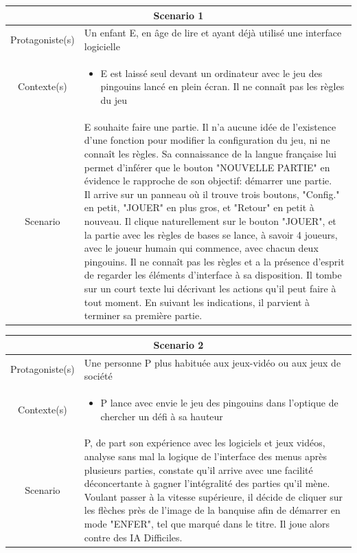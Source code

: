 \documentclass{report}
\begin{document}
\begin{tabular}{|c|l|}
 \hline
 \multicolumn{2}{|c|}{Scenario 1}\\
 \hline
 Protagoniste(s) & Un enfant E, en âge de lire et ayant déjà utilisé une interface logicielle \\
 \hline
 Contexte(s) & \parbox{13cm} {\begin{itemize}
 	\item E est laissé seul devant un ordinateur avec le jeu des pingouins lancé en plein écran. Il ne connaît pas les règles du jeu
\end{itemize} }\\
 \hline
 Scenario & \parbox{13cm}{ E souhaite faire une partie. Il n'a aucune idée de l'existence d'une fonction pour modifier la configuration du jeu, ni ne connaît les règles. Sa connaissance de la langue française lui permet d'inférer que le bouton "NOUVELLE PARTIE" en évidence le rapproche de son objectif: démarrer une partie. \\
 Il arrive sur un panneau où il trouve trois boutons, "Config." en petit, "JOUER" en plus gros, et "Retour" en petit à nouveau. Il clique naturellement sur le bouton "JOUER", et la partie avec les règles de bases se lance, à savoir 4 joueurs, avec le joueur humain qui commence, avec chacun deux pingouins. Il ne connaît pas les règles et a la présence d'esprit de regarder les éléments d'interface à sa disposition. Il tombe sur un court texte lui décrivant les actions qu'il peut faire à tout moment. En suivant les indications, il parvient à terminer sa première partie.} \\
 \hline
 \end{tabular}

\vspace{0.4cm} 
 
  \begin{tabular}{|c|l|}
  \hline
 \multicolumn{2}{|c|}{Scenario 2}\\
 \hline
 Protagoniste(s) & Une personne P plus habituée aux jeux-vidéo ou aux jeux de société \\
 \hline
 Contexte(s) & \parbox{13cm} {\begin{itemize}
 	\item P lance avec envie le jeu des pingouins dans l'optique de chercher un défi à sa hauteur
\end{itemize} }\\
 \hline
 Scenario & \parbox{13cm}{ P, de part son expérience avec les logiciels et jeux vidéos, analyse sans mal la logique de l'interface des menus après plusieurs parties, constate qu'il arrive avec une facilité déconcertante à gagner l'intégralité des parties qu'il mène. Voulant passer à la vitesse supérieure, il décide de cliquer sur les flèches près de l'image de la banquise afin de démarrer en mode "ENFER", tel que marqué dans le titre. Il joue alors contre des IA Difficiles.} \\
 \hline
 \end{tabular}
 
\end{document}
